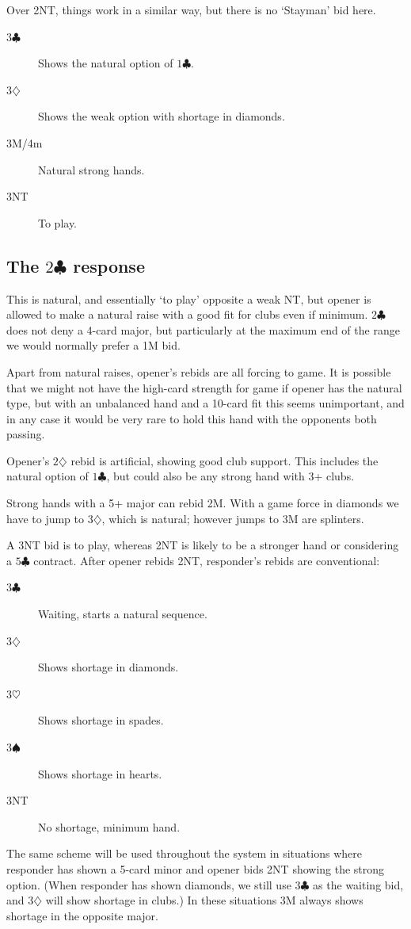 \documentclass{article}
\newcommand{\sz}{\spadesuit}
\newcommand{\hz}{\heartsuit}
\newcommand{\dz}{\diamondsuit}
\newcommand{\cz}{\clubsuit}
\begin{document}
Over 2NT, things work in a similar way, but there is no `Stayman' bid here.
\begin{description}
\item[3$\cz$] Shows the natural option of $1\cz$.
\item[3$\dz$] Shows the weak option with shortage in diamonds.
\item[3M/4m] Natural strong hands.
\item[3NT] To play.
\end{description}

\subsection{The $2\cz$ response}

This is natural, and essentially `to play' opposite a weak NT, but opener is allowed to make a natural raise with a good fit for clubs even if minimum. $2\cz$ does not deny a 4-card major, but particularly at the maximum end of the range we would normally prefer a 1M bid.

Apart from natural raises, opener's rebids are all forcing to game. It is possible that we might not have the high-card strength for game if opener has the natural type, but with an unbalanced hand and a 10-card fit this seems unimportant, and in any case it would be very rare to hold this hand with the opponents both passing.

Opener's $2\dz$ rebid is artificial, showing good club support. This includes the natural option of $1\cz$, but could also be any strong hand with 3+ clubs.

Strong hands with a 5+ major can rebid 2M. With a game force in diamonds we have to jump to $3\dz$, which is natural; however jumps to 3M are splinters.

A 3NT bid is to play, whereas 2NT is likely to be a stronger hand or considering a $5\cz$ contract. After opener rebids 2NT, responder's rebids are conventional:
\begin{description}
\item[3$\cz$] Waiting, starts a natural sequence.
\item[3$\dz$] Shows shortage in diamonds.
\item[3$\hz$] Shows shortage in spades.
\item[3$\sz$] Shows shortage in hearts.
\item[3NT] No shortage, minimum hand.
\end{description}
The same scheme will be used throughout the system in situations where responder has shown a 5-card minor and opener bids 2NT showing the strong option. (When responder has shown diamonds, we still use $3\cz$ as the waiting bid, and $3\dz$ will show shortage in clubs.) In these situations 3M always shows shortage in the opposite major.
\end{document}
